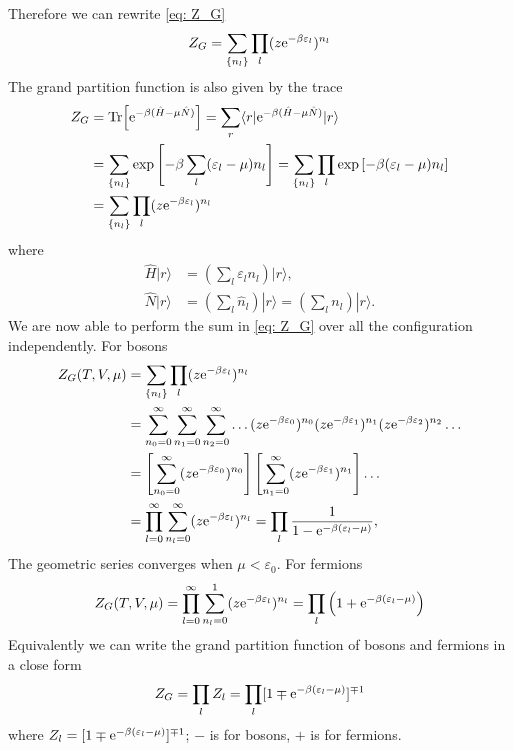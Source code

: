\documentclass[10pt]{article}
\begin{document}
	Therefore we can rewrite \eqref{eq: Z_G}
	\begin{equation}
		Z_G = \sum_{\{ n_l \}} \prod_l (z {\mathrm{e}}^{-\beta \varepsilon_l})^{n_l}
	\end{equation}
	The grand partition function is also given by the trace
	\begin{align*}
		Z_G &= \Tr[{\mathrm{e}}^{-\beta(\hat{H} - \mu \hat{N})}] = \sum_r \langle r | {\mathrm{e}}^{-\beta(\hat{H} - \mu \hat{N})} | r \rangle \\
		&= \sum_{\{ n_l \}} \exp\left[-\beta \sum_l ( \varepsilon_l - \mu)n_l \right] = \sum_{\{ n_l \}} \prod_l \exp\left[-\beta ( \varepsilon_l - \mu)n_l \right] \\
		&= \sum_{\{ n_l \}} \prod_l (z {\mathrm{e}}^{-\beta \varepsilon_l})^{n_l}
	\end{align*}
	where
	\begin{align}
		\hat{H} | r \rangle &= \left(\sum_l \varepsilon_l n_l\right) | r \rangle, \\
		\hat{N} | r \rangle &= \left(\sum_l \hat{n}_l\right) | r \rangle = \left(\sum_l n_l\right) | r \rangle.
	\end{align}
	We are now able to perform the sum in \eqref{eq: Z_G} over all the configuration independently.
	For bosons
	\begin{align*}
		Z_{G}(T,V, \mu) &= \sum_{\{ n_l \}} \prod_l (z {\mathrm{e}}^{-\beta \varepsilon_l})^{n_l} \\
		&= \sum_{n_0 = 0}^{\infty} \sum_{n_1 = 0}^{\infty} \sum_{n_2 = 0}^{\infty} \dots (z {\mathrm{e}}^{-\beta \varepsilon_0})^{n_0} (z {\mathrm{e}}^{-\beta \varepsilon_1})^{n_1} (z {\mathrm{e}}^{-\beta \varepsilon_2})^{n_2} \dots \\
		&= \left[ \sum_{n_0 = 0}^{\infty} (z {\mathrm{e}}^{-\beta \varepsilon_0})^{n_0} \right] \left[ \sum_{n_1 = 0}^{\infty} (z {\mathrm{e}}^{-\beta \varepsilon_1})^{n_1} \right] \dots \\
		&= \prod_{l=0}^{\infty} \sum_{n_l = 0}^{\infty} (z {\mathrm{e}}^{-\beta \varepsilon_l})^{n_l} =
		\prod_l \frac{1}{1 - {\mathrm{e}}^{-\beta(\varepsilon_l - \mu)}},
	\end{align*}
	The geometric series converges when $\mu < \varepsilon_0$. For fermions
	\begin{equation}
		Z_{G}(T,V, \mu) = \prod_{l=0}^{\infty} \sum_{n_l = 0}^{1} (z {\mathrm{e}}^{-\beta \varepsilon_l})^{n_l} =
		\prod_l \left(1 + {\mathrm{e}}^{-\beta(\varepsilon_l - \mu)}\right)
	\end{equation}
	Equivalently we can write the grand partition function of bosons and fermions in a close form
	\begin{equation}
		Z_G = \prod_l Z_l = \prod_l [1 \mp {\mathrm{e}}^{-\beta(\varepsilon_l - \mu)}]^{\mp 1}
	\end{equation}
	where $Z_l = [1 \mp {\mathrm{e}}^{-\beta(\varepsilon_l - \mu)}]^{\mp 1}$; $-$ is for bosons, $+$ is for fermions.
\end{document}

